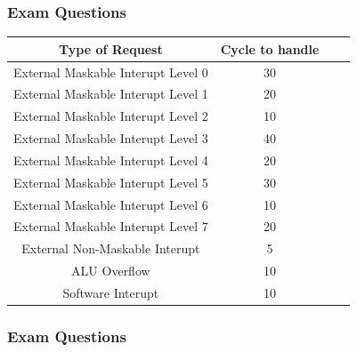 \begin{frame}
    \frametitle{Exam Questions}
    \begin{table}
        \begin{tabular}{|c|c|c|c|}
            \hline
            Type of Request & Cycle to handle \\ \hline
            External Maskable Interupt Level 0 & 30 \\ \hline
            External Maskable Interupt Level 1 & 20 \\ \hline
            External Maskable Interupt Level 2 & 10 \\ \hline
            External Maskable Interupt Level 3 & 40 \\ \hline
            External Maskable Interupt Level 4 & 20 \\ \hline
            External Maskable Interupt Level 5 & 30 \\ \hline
            External Maskable Interupt Level 6 & 10 \\ \hline
            External Maskable Interupt Level 7 & 20 \\ \hline
            External Non-Maskable Interupt & 5 \\ \hline
            ALU Overflow & 10 \\ \hline
            Software Interupt & 10 \\ \hline
        \end{tabular}
    \end{table}
\end{frame}



\begin{frame}
    \frametitle{Exam Questions}
\end{frame}